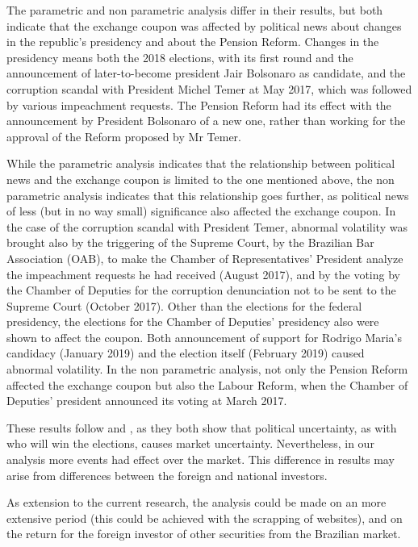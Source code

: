 \documentclass[cic,tc, english]{iiufrgs}
\begin{document}
    The parametric and non parametric analysis differ in their results, but both indicate that the exchange coupon was affected by political news about changes in the republic's presidency and about the Pension Reform. Changes in the presidency means both the 2018 elections, with its first round and the announcement of later-to-become president Jair Bolsonaro as candidate, and the corruption scandal with President Michel Temer at May 2017, which was followed by various impeachment requests. The Pension Reform had its effect with the announcement by President Bolsonaro of a new one, rather than working for the approval of the Reform proposed by Mr Temer.

    While the parametric analysis indicates that the relationship between political news and the exchange coupon is limited to the one mentioned above, the non parametric analysis indicates that this relationship goes further, as political news of less (but in no way small) significance also affected the exchange coupon. In the case of the corruption scandal with President Temer, abnormal volatility was brought also by the triggering of the Supreme Court, by the Brazilian Bar Association (OAB), to make the Chamber of Representatives' President analyze the impeachment requests he had received (August 2017), and by the voting by the Chamber of Deputies for the corruption denunciation not to be sent to the Supreme Court (October 2017). Other than the elections for the federal presidency, the elections for the Chamber of Deputies' presidency also were shown to affect the coupon. Both announcement of support for Rodrigo Maria's candidacy (January 2019) and the election itself (February 2019) caused abnormal volatility. In the non parametric analysis, not only the Pension Reform affected the exchange coupon but also the Labour Reform, when the Chamber of Deputies' president announced its voting at March 2017.

    These results follow \citet{smales2015} and \citet{marquessantos2016}, as they both show that political uncertainty, as with who will win the elections, causes market uncertainty. Nevertheless, in our analysis more events  had effect over the market. This difference in results may arise from differences between the foreign and national investors.

    As extension to the current research, the analysis could be made on an more extensive period (this could be achieved with the scrapping of websites), and on the return for the foreign investor of other securities from the Brazilian market.
\end{document}
